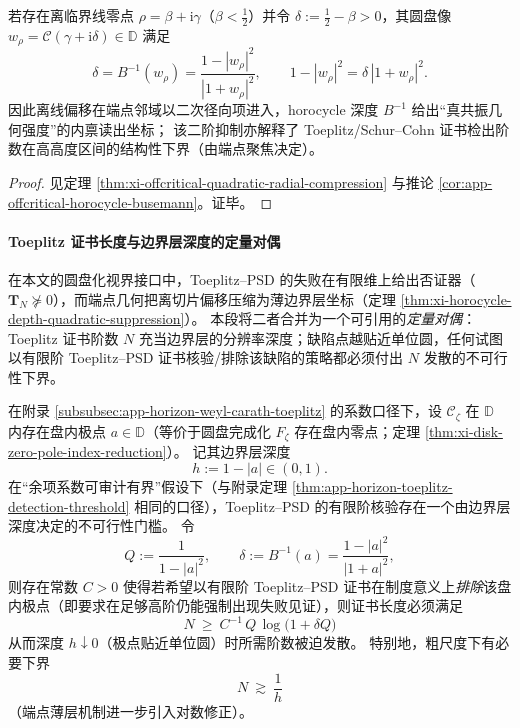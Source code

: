 \begin{theorem}\label{thm:xi-horocycle-depth-quadratic-suppression}
若存在离临界线零点 \(\rho=\beta+\mathrm{i}\gamma\)（\(\beta<\tfrac12\)）并令 \(\delta:=\tfrac12-\beta>0\)，其圆盘像 \(w_\rho=\mathcal{C}(\gamma+\mathrm{i}\delta)\in\mathbb{D}\) 满足
\[
\boxed{\;
\delta=B^{-1}(w_\rho)=\frac{1-|w_\rho|^2}{|1+w_\rho|^2},\qquad
1-|w_\rho|^2=\delta\,|1+w_\rho|^2.\;}
\]
因此离线偏移在端点邻域以二次径向项进入，horocycle 深度 \(B^{-1}\) 给出“真共振几何强度”的内禀读出坐标；
该二阶抑制亦解释了 Toeplitz/Schur--Cohn 证书检出阶数在高高度区间的结构性下界（由端点聚焦决定）。
\end{theorem}

\begin{proof}
见定理 \ref{thm:xi-offcritical-quadratic-radial-compression} 与推论 \ref{cor:app-offcritical-horocycle-busemann}。证毕。
\end{proof}

\paragraph{Toeplitz 证书长度与边界层深度的定量对偶}
在本文的圆盘化视界接口中，Toeplitz--PSD 的失败在有限维上给出否证器（\(\mathbf{T}_N\nsucceq 0\)），而端点几何把离切片偏移压缩为薄边界层坐标（定理 \ref{thm:xi-horocycle-depth-quadratic-suppression}）。
本段将二者合并为一个可引用的\emph{定量对偶}：Toeplitz 证书阶数 \(N\) 充当边界层的分辨率深度；缺陷点越贴近单位圆，任何试图以有限阶 Toeplitz--PSD 证书核验/排除该缺陷的策略都必须付出 \(N\) 发散的不可行性下界。

\begin{theorem}\label{thm:xi-toeplitz-length-vs-boundary-depth}
在附录 \ref{subsubsec:app-horizon-weyl-carath-toeplitz} 的系数口径下，设 \(\mathscr{C}_{\zeta}\) 在 \(\mathbb{D}\) 内存在盘内极点 \(a\in\mathbb{D}\)（等价于圆盘完成化 \(F_{\zeta}\) 存在盘内零点；定理 \ref{thm:xi-disk-zero-pole-index-reduction}）。
记其边界层深度
\[
h:=1-|a|\in(0,1).
\]
在“余项系数可审计有界”假设下（与附录定理 \ref{thm:app-horizon-toeplitz-detection-threshold} 相同的口径），Toeplitz--PSD 的有限阶核验存在一个由边界层深度决定的不可行性门槛。
令
\[
Q:=\frac{1}{1-|a|^2},\qquad
\delta:=B^{-1}(a)=\frac{1-|a|^2}{|1+a|^2},
\]
则存在常数 \(C>0\) 使得若希望以有限阶 Toeplitz--PSD 证书在制度意义上\emph{排除}该盘内极点（即要求在足够高阶仍能强制出现失败见证），则证书长度必须满足
\[
\boxed{\;
N\ \ge\ C^{-1}\,Q\,\log\!\bigl(1+\delta Q\bigr)\;}
\]
从而深度 \(h\downarrow 0\)（极点贴近单位圆）时所需阶数被迫发散。
特别地，粗尺度下有必要下界
\[
\boxed{\;
N\ \gtrsim\ \frac{1}{h}\;}
\]
（端点薄层机制进一步引入对数修正）。
\end{theorem}

